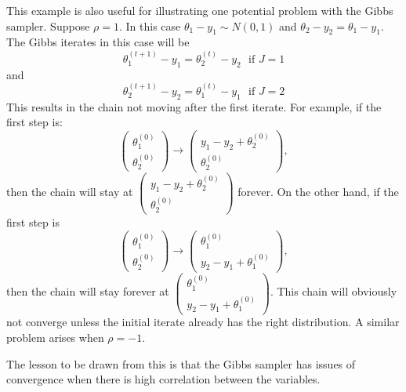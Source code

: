 \documentclass{scrartcl}
\begin{document}
  This example is also useful for illustrating one potential problem
  with the Gibbs sampler. Suppose $\rho = 1$. In this case $\theta_1 -
  y_1 \sim N(0, 1)$ and $\theta_2 - y_2 = \theta_1 - y_1$. The Gibbs
  iterates in this case will be
  \begin{equation*}
    \theta_1^{(t+1)} - y_1 = \theta_2^{(t)} - y_2 ~~~ \text{if $J = 1$}
  \end{equation*}
  and
  \begin{equation*}
    \theta_2^{(t+1)} - y_2 = \theta_1^{(t)} - y_1 ~~~ \text{if $J = 2$}
  \end{equation*}
  This results in the chain not moving after the first iterate. For
  example, if the first step is: 
  \begin{equation*}
    \begin{pmatrix} \theta_1^{(0)} \\ \theta_2^{(0)}\end{pmatrix}
    \rightarrow   \begin{pmatrix} y_1 - y_2 + \theta_2^{(0)}\\
      \theta_2^{(0)}\end{pmatrix},  
  \end{equation*}
  then the chain will stay at $\begin{pmatrix} y_1 - y_2 + \theta_2^{(0)}\\
      \theta_2^{(0)}\end{pmatrix}$ forever. On the other hand, if the
    first step is
  \begin{equation*}
    \begin{pmatrix} \theta_1^{(0)} \\ \theta_2^{(0)}\end{pmatrix}
    \rightarrow   \begin{pmatrix} \theta_1^{(0)}\\
      y_2 - y_1 + \theta_1^{(0)}\end{pmatrix},  
  \end{equation*}
  then the chain will stay forever at  $\begin{pmatrix} \theta_1^{(0)}\\
      y_2 - y_1 + \theta_1^{(0)}\end{pmatrix}$. This chain will obviously
    not converge unless the initial iterate already has the right
    distribution. A similar problem arises when $\rho = -1$. 

    The lesson to be drawn from this is that the Gibbs sampler has
    issues of convergence when there is high correlation between the
    variables. 
\end{document}
